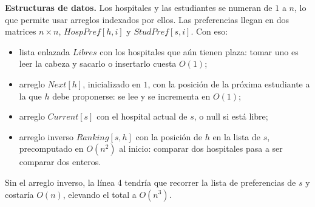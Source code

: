 \documentclass[12pt, spanish, oneside, openany]{book}
\newenvironment{estructuras}%
  {\begin{center}\begin{minipage}{0.93\textwidth}\begin{mdframed}[style=estrbox]%
   \small\textbf{Estructuras de datos.}\;}%
  {\end{mdframed}\end{minipage}\end{center}}
\theoremstyle{uprightplain}
\theoremstyle{definition}
\theoremstyle{remark}
\theoremstyle{definition}
\begin{document}
\begin{estructuras}
Los hospitales y las estudiantes se numeran de $1$ a $n$, lo que permite usar
arreglos indexados por ellos. Las preferencias llegan en dos matrices
$n\times n$, $\mathit{HospPref}[h,i]$ y $\mathit{StudPref}[s,i]$. Con eso:

\begin{itemize}
    \item lista enlazada $\mathit{Libres}$ con los hospitales que aún
    tienen plaza: tomar uno es leer la cabeza y sacarlo o insertarlo cuesta
    $O(1)$;
    \item arreglo $\mathit{Next}[h]$, inicializado en $1$, con la
    posición de la próxima estudiante a la que $h$ debe proponerse: se lee y se
    incrementa en $O(1)$;
    \item arreglo $\mathit{Current}[s]$ con el hospital actual de $s$,
    o null si está libre;
    \item arreglo inverso $\mathit{Ranking}[s,h]$ con la posición de $h$
    en la lista de $s$, precomputado en $O(n^2)$ al inicio: comparar dos
    hospitales pasa a ser comparar dos enteros.
\end{itemize}

Sin el arreglo inverso, la línea 4 tendría que recorrer la lista de preferencias
de $s$ y costaría $O(n)$, elevando el total a $O(n^3)$.
\end{estructuras}
\end{document}
